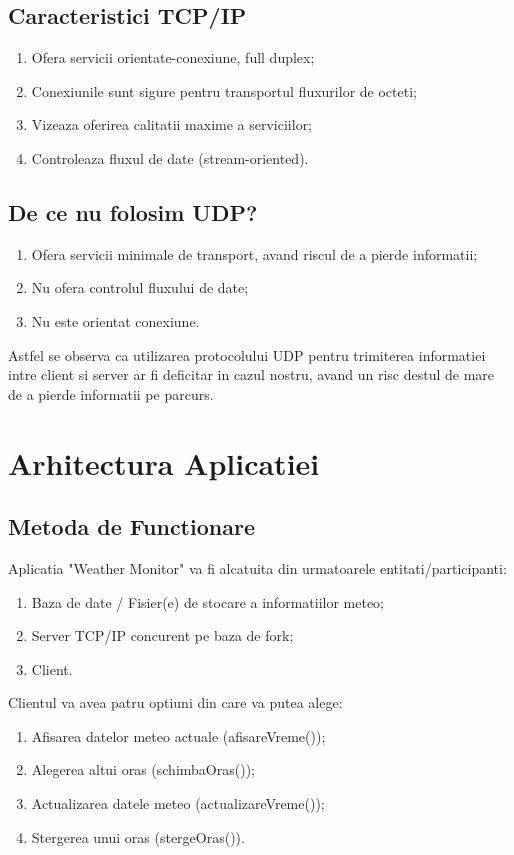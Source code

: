\documentclass{llncs}
\begin{document}
\subsection{Caracteristici TCP/IP}
%
\begin{enumerate}
%
\item Ofera servicii orientate-conexiune, full duplex;
\item Conexiunile sunt sigure pentru transportul fluxurilor de octeti;
\item Vizeaza oferirea calitatii maxime a serviciilor;
\item Controleaza fluxul de date (stream-oriented).
\end{enumerate}
%
\subsection{De ce nu folosim UDP?}
%
\begin{enumerate}
\item Ofera servicii minimale de transport, avand riscul de a pierde informatii;
\item Nu ofera controlul fluxului de date;
\item Nu este orientat conexiune.
\end{enumerate}
%
Astfel se observa ca utilizarea protocolului UDP pentru trimiterea informatiei intre client si server ar fi deficitar in cazul nostru, avand un risc destul de mare de a pierde informatii pe parcurs.
%
\section{Arhitectura Aplicatiei}
%
\subsection{Metoda de Functionare}
%
Aplicatia "Weather Monitor" va fi alcatuita din urmatoarele entitati/participanti:
%
\begin{enumerate}
\item Baza de date / Fisier(e) de stocare a informatiilor meteo;
\item Server TCP/IP concurent pe baza de fork;
\item Client.
\end{enumerate}
%
Clientul va avea patru optiuni din care va putea alege:
%
\begin{enumerate}
\item Afisarea datelor meteo actuale (afisareVreme());
\item Alegerea altui oras (schimbaOras());
\item Actualizarea datele meteo (actualizareVreme());
\item Stergerea unui oras (stergeOras()).
\end{enumerate}
%
\end{document}
